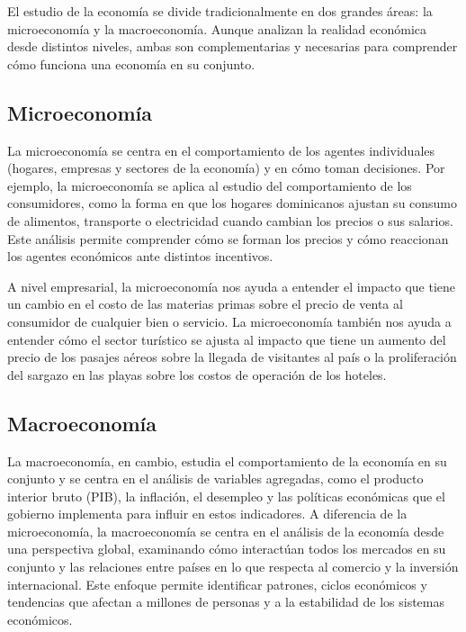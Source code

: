 \documentclass[
  letterpaper,
  DIV=11,
  numbers=noendperiod,
  oneside]{scrreprt}
\begin{document}
El estudio de la economía se divide tradicionalmente en dos grandes
áreas: la microeconomía y la macroeconomía. Aunque analizan la realidad
económica desde distintos niveles, ambas son complementarias y
necesarias para comprender cómo funciona una economía en su conjunto.

\subsection{Microeconomía}\label{microeconomuxeda}

La microeconomía se centra en el comportamiento de los agentes
individuales (hogares, empresas y sectores de la economía) y en cómo
toman decisiones. Por ejemplo, la microeconomía se aplica al estudio del
comportamiento de los consumidores, como la forma en que los hogares
dominicanos ajustan su consumo de alimentos, transporte o electricidad
cuando cambian los precios o sus salarios. Este análisis permite
comprender cómo se forman los precios y cómo reaccionan los agentes
económicos ante distintos incentivos.

A nivel empresarial, la microeconomía nos ayuda a entender el impacto
que tiene un cambio en el costo de las materias primas sobre el precio
de venta al consumidor de cualquier bien o servicio. La microeconomía
también nos ayuda a entender cómo el sector turístico se ajusta al
impacto que tiene un aumento del precio de los pasajes aéreos sobre la
llegada de visitantes al país o la proliferación del sargazo en las
playas sobre los costos de operación de los hoteles.

\subsection{Macroeconomía}\label{macroeconomuxeda}

La macroeconomía, en cambio, estudia el comportamiento de la economía en
su conjunto y se centra en el análisis de variables agregadas, como el
producto interior bruto (PIB), la inflación, el desempleo y las
políticas económicas que el gobierno implementa para influir en estos
indicadores. A diferencia de la microeconomía, la macroeconomía se
centra en el análisis de la economía desde una perspectiva global,
examinando cómo interactúan todos los mercados en su conjunto y las
relaciones entre países en lo que respecta al comercio y la inversión
internacional. Este enfoque permite identificar patrones, ciclos
económicos y tendencias que afectan a millones de personas y a la
estabilidad de los sistemas económicos.
\end{document}
